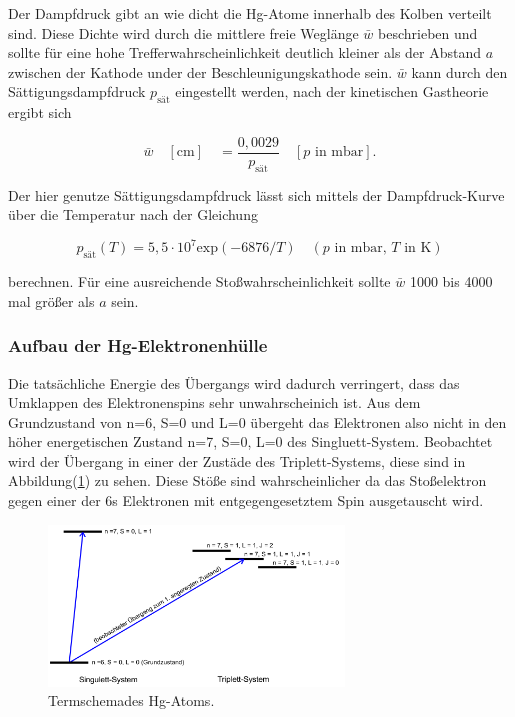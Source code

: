             \noindent Der Dampfdruck gibt an wie dicht die Hg-Atome innerhalb des Kolben verteilt sind. Diese Dichte wird durch die mittlere 
            freie Weglänge $\bar{w}$ beschrieben und sollte für eine hohe Trefferwahrscheinlichkeit deutlich kleiner als der Abstand $a$ zwischen
            der Kathode under der Beschleunigungskathode sein. $\bar{w}$ kann durch den Sättigungsdampfdruck $p_{\text{sät}}$ eingestellt werden, 
            nach der kinetischen Gastheorie ergibt sich 

            \begin{equation*}
                \bar{w} \quad [\text{cm}] \quad = \frac{0,0029}{p_{\text{sät}}} \quad [p \text{ in mbar}] .
            \end{equation*}

            \noindent Der hier genutze Sättigungsdampfdruck lässt sich mittels der Dampfdruck-Kurve über die Temperatur nach der Gleichung 

            \begin{equation*}
                p_{\text{sät}}(T) = 5,5\cdot10^{7} \text{exp}(-6876/T)  \quad (p \text{ in mbar, } T \text{ in K}) 
            \end{equation*}

            \noindent berechnen. Für eine ausreichende Stoßwahrscheinlichkeit sollte $\bar{w}$ 1000 bis 4000 mal größer als $a$ sein. 

        \subsubsection{Aufbau der Hg-Elektronenhülle}

            \noindent Die tatsächliche Energie des Übergangs wird dadurch verringert, dass das Umklappen des Elektronenspins sehr 
            unwahrscheinich ist. Aus dem Grundzustand von n=6, S=0 und L=0 übergeht das Elektronen also nicht in den höher energetischen 
            Zustand n=7, S=0, L=0 des Singluett-System. Beobachtet wird der Übergang in einer der Zustäde des Triplett-Systems, diese sind in 
            Abbildung(\ref{img:Term}) zu sehen. Diese Stöße sind wahrscheinlicher da das Stoßelektron gegen einer der 6s Elektronen mit 
            entgegengesetztem Spin ausgetauscht wird.

            \begin{figure}[ht]
                \centering
                \includegraphics[width=0.7\textwidth]{latex/images/Singulett.PNG}
                \caption{Termschemades Hg-Atoms.}
                \label{img:Term}
            \end{figure}

